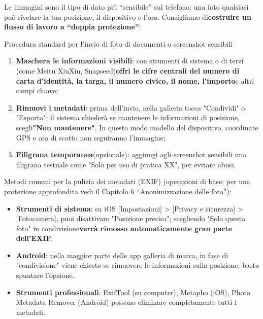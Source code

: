 
Le immagini sono il tipo di dato più “sensibile” sul telefono: una foto qualsiasi può rivelare la tua posizione, il dispositivo e l'ora. Consigliamo di\textbf{costruire un flusso di lavoro a “doppia protezione”}:

\begin{tcbwarn}{Procedura standard per l'invio di foto di documenti o screenshot sensibili}
\begin{enumerate}
  \item \textbf{Maschera le informazioni visibili}: con strumenti di sistema o di terzi (come Meitu XiuXiu, Snapseed)\textbf{offri le cifre centrali del numero di carta d'identità, la targa, il numero civico, il nome, l'importo}e altri campi chiave;
  \item \textbf{Rimuovi i metadati}: prima dell'invio, nella galleria tocca "Condividi" o "Esporta"; il sistema chiederà se mantenere le informazioni di posizione, scegli\textbf{"Non mantenere"}. In questo modo modello del dispositivo, coordinate GPS e ora di scatto non seguiranno l'immagine;
  \item \textbf{Filigrana temporanea}(opzionale): aggiungi agli screenshot sensibili una filigrana testuale come "Solo per uso di pratica XX", per evitare abusi.
\end{enumerate}

\end{tcbwarn}

Metodi comuni per la pulizia dei metadati (EXIF) (operazioni di base; per una protezione approfondita vedi il Capitolo 6 “Anonimizzazione delle foto”):

\begin{itemize}
  \item \textbf{Strumenti di sistema}: su iOS [Impostazioni] > [Privacy e sicurezza] > [Fotocamera], puoi disattivare "Posizione precisa"; scegliendo "Solo questa foto" in condivisione\textbf{verrà rimosso automaticamente gran parte dell'EXIF}.
  \item \textbf{Android}: nella maggior parte delle app galleria di marca, in fase di "condivisione" viene chiesto se rimuovere le informazioni sulla posizione; basta spuntare l'opzione.
  \item \textbf{Strumenti professionali}: ExifTool (su computer), Metapho (iOS), Photo Metadata Remover (Android) possono eliminare completamente tutti i metadati.
\end{itemize}

